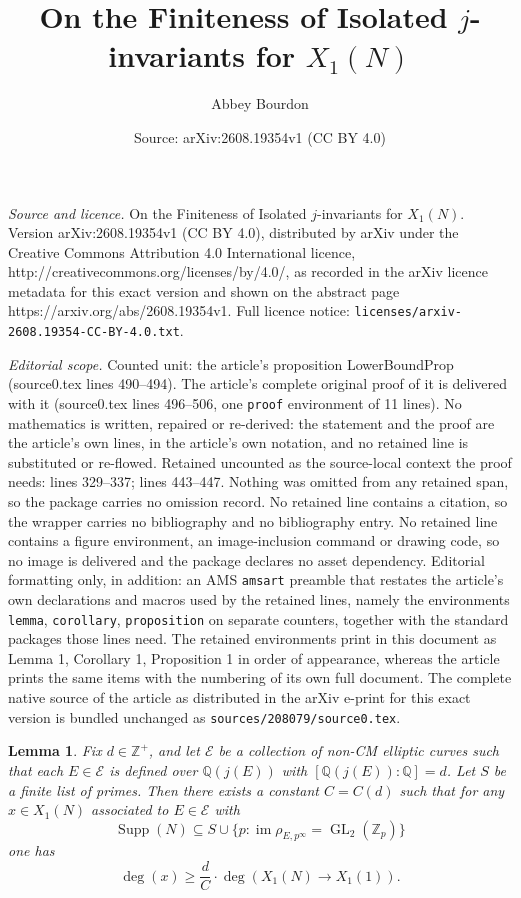 \documentclass[10pt,a4paper]{amsart}
\title{On the Finiteness of Isolated $j$-invariants for $X_1(N)$}
\author{Abbey Bourdon}
\date{Source: arXiv:2608.19354v1 (CC BY 4.0)}
\newtheorem{lemma}{Lemma}
\newcommand{\GL}{\operatorname{GL}}
\newcommand{\Q}{\mathbb{Q}}
\newcommand{\Supp}{\operatorname{Supp}}
\newcommand{\Z}{\mathbb{Z}}
\DeclareMathOperator{\im}{im}
\begin{document}
\maketitle

\noindent\emph{Source and licence.} On the Finiteness of Isolated $j$-invariants for $X_1(N)$. Version arXiv:2608.19354v1 (CC BY 4.0), distributed by arXiv under the Creative Commons Attribution 4.0 International licence, http://creativecommons.org/licenses/by/4.0/, as recorded in the arXiv licence metadata for this exact version and shown on the abstract page https://arxiv.org/abs/2608.19354v1. Full licence notice: \texttt{licenses/arxiv-2608.19354-CC-BY-4.0.txt}.\par\smallskip

\noindent\textit{Editorial scope.} Counted unit: the article's proposition LowerBoundProp (source0.tex lines 490--494). The article's complete original proof of it is delivered with it (source0.tex lines 496--506, one \texttt{proof} environment of 11 lines). No mathematics is written, repaired or re-derived: the statement and the proof are the article's own lines, in the article's own notation, and no retained line is substituted or re-flowed.  Retained uncounted as the source-local context the proof needs: lines 329--337; lines 443--447.  Nothing was omitted from any retained span, so the package carries no omission record.  No retained line contains a citation, so the wrapper carries no bibliography and no bibliography entry.  No retained line contains a figure environment, an image-inclusion command or drawing code, so no image is delivered and the package declares no asset dependency.  Editorial formatting only, in addition: an AMS \texttt{amsart} preamble that restates the article's own declarations and macros used by the retained lines, namely the environments \texttt{lemma}, \texttt{corollary}, \texttt{proposition} on separate counters, together with the standard packages those lines need.  The retained environments print in this document as Lemma 1, Corollary 1, Proposition 1 in order of appearance, whereas the article prints the same items with the numbering of its own full document.  The complete native source of the article as distributed in the arXiv e-print for this exact version is bundled unchanged as \texttt{sources/208079/source0.tex}.
\begin{lemma}\label{Finite_Degree_Bounds}
Fix $d \in \Z^+$, and let $\mathcal{E}$ be a collection of non-CM elliptic curves such that each $E\in \mathcal{E}$ is defined over $\Q(j(E))$ with $[\Q(j(E)):\Q]=d$. Let $S$ be a finite list of primes. Then there exists a constant $C=C(d)$ such that for any $x\in X_1(N)$ associated to $E \in \mathcal{E}$ with
\[
\Supp(N) \subseteq S \cup \{p: \im \rho_{E, p^{\infty}}=\GL_2(\Z_{p}) \}
\] one has
   \[
    \deg(x)\geq \frac{d}{C} \cdot \deg(X_1(N) \rightarrow X_1(1)).
    \]
\end{lemma}
\end{document}
